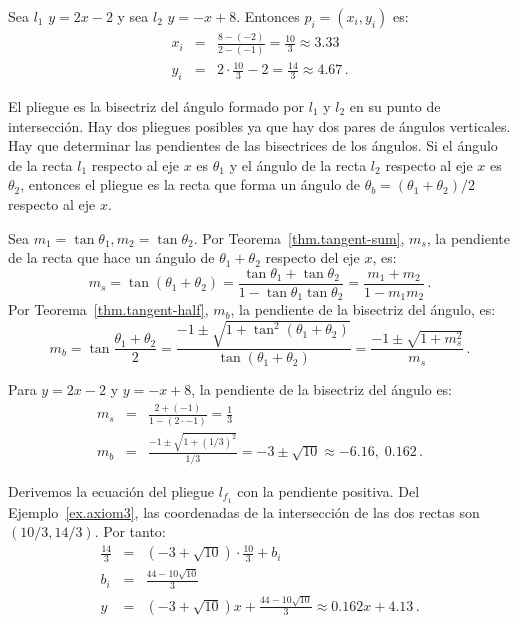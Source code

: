 \begin{example}\label{ex.axiom3}
Sea $l_1$ $y=2x-2$ y sea $l_2$ $y=-x+8$. Entonces $p_i=(x_i,y_i)$ es:
\begin{eqnarray*}
x_i&=&\frac{8-(-2)}{2-(-1)}=\frac{10}{3}\approx 3.33\\
y_i &=& 2\cdot\frac{10}{3}-2=\frac{14}{3}\approx 4.67\,.
\end{eqnarray*}
\end{example}

El pliegue es la bisectriz del ángulo formado por $l_1$ y $l_2$ en su punto de intersección. Hay dos pliegues posibles ya que hay dos pares de ángulos verticales. Hay que determinar las pendientes de las bisectrices de los ángulos. Si el ángulo de la recta $l_1$ respecto al eje $x$ es $\theta_1$ y el ángulo de la recta $l_2$ respecto al eje $x$ es $\theta_2$, entonces el pliegue es la recta que forma un ángulo de $\theta_b=(\theta_1+\theta_2)/2$ respecto al eje $x$.

Sea $m_1=\tan \theta_1, m_2=\tan \theta_2$. Por Teorema~\ref{thm.tangent-sum}, $m_s$, la pendiente de la recta que hace un ángulo de $\theta_1+\theta_2$ respecto del eje $x$, es:
\[
m_s=\tan(\theta_1+\theta_2)= \frac{\tan\theta_1+\tan\theta_2}{1-\tan\theta_1\tan\theta_2}=\frac{m_1+m_2}{1-m_1m_2}\,.
\]
Por Teorema~\ref{thm.tangent-half}, $m_b$, la pendiente de la bisectriz del ángulo, es:
\[
m_b= \tan\frac{\theta_1+\theta_2}{2}=\frac{-1\pm\sqrt{1+\tan^2(\theta_1+\theta_2)}}{\tan (\theta_1+\theta_2)}=\frac{-1\pm\sqrt{1+m_s^2}}{m_s}\,.
\]
\begin{example}
Para $y=2x-2$ y $y=-x+8$, la pendiente de la bisectriz del ángulo es:
\begin{eqnarray*}
m_s&=&\frac{2+(-1)}{1-(2 \cdot -1)}=\frac{1}{3}\\
m_b&=&\frac{-1\pm\sqrt{1+(1/3)^2}}{1/3}=-3\pm \sqrt{10}\approx -6.16,\; 0.162\,.
\end{eqnarray*}
\end{example}

Derivemos la ecuación del pliegue $l_{f_1}$ con la pendiente positiva. Del Ejemplo~\ref{ex.axiom3}, las coordenadas de la intersección de las dos rectas son $(10/3, 14/3)$. Por tanto:
\begin{eqnarray*}
\frac{14}{3} &=& (-3+\sqrt{10}) \cdot \frac{10}{3} + b_i\\ b_i&=&\frac{44-10\sqrt{10}}{3}\\
y&=& (-3+\sqrt{10})x + \frac{44-10\sqrt{10}}{3}\approx 0.162x+4.13\,.
\end{eqnarray*}

